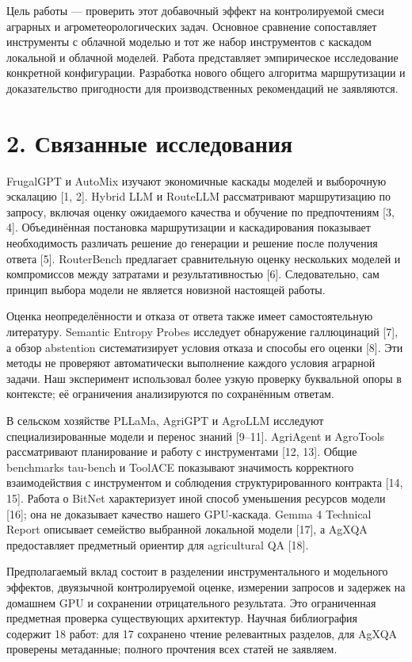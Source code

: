 \documentclass[14pt,a4paper]{extarticle}
\begin{document}
Цель работы --- проверить этот добавочный эффект на контролируемой смеси аграрных и агрометеорологических задач. Основное сравнение сопоставляет инструменты с облачной моделью и тот же набор инструментов с каскадом локальной и облачной моделей. Работа представляет эмпирическое исследование конкретной конфигурации. Разработка нового общего алгоритма маршрутизации и доказательство пригодности для производственных рекомендаций не заявляются.


\section*{2. Связанные исследования}

FrugalGPT и AutoMix изучают экономичные каскады моделей и выборочную эскалацию [1, 2]. Hybrid LLM и RouteLLM рассматривают маршрутизацию по запросу, включая оценку ожидаемого качества и обучение по предпочтениям [3, 4]. Объединённая постановка маршрутизации и каскадирования показывает необходимость различать решение до генерации и решение после получения ответа [5]. RouterBench предлагает сравнительную оценку нескольких моделей и компромиссов между затратами и результативностью [6]. Следовательно, сам принцип выбора модели не является новизной настоящей работы.


Оценка неопределённости и отказа от ответа также имеет самостоятельную литературу. Semantic Entropy Probes исследует обнаружение галлюцинаций [7], а обзор abstention систематизирует условия отказа и способы его оценки [8]. Эти методы не проверяют автоматически выполнение каждого условия аграрной задачи. Наш эксперимент использовал более узкую проверку буквальной опоры в контексте; её ограничения анализируются по сохранённым ответам.


В сельском хозяйстве PLLaMa, AgriGPT и AgroLLM исследуют специализированные модели и перенос знаний [9--11]. AgriAgent и AgroTools рассматривают планирование и работу с инструментами [12, 13]. Общие benchmarks tau-bench и ToolACE показывают значимость корректного взаимодействия с инструментом и соблюдения структурированного контракта [14, 15]. Работа о BitNet характеризует иной способ уменьшения ресурсов модели [16]; она не доказывает качество нашего GPU-каскада. Gemma 4 Technical Report описывает семейство выбранной локальной модели [17], а AgXQA предоставляет предметный ориентир для agricultural QA [18].


Предполагаемый вклад состоит в разделении инструментального и модельного эффектов, двуязычной контролируемой оценке, измерении запросов и задержек на домашнем GPU и сохранении отрицательного результата. Это ограниченная предметная проверка существующих архитектур. Научная библиография содержит 18 работ: для 17 сохранено чтение релевантных разделов, для AgXQA проверены метаданные; полного прочтения всех статей не заявляем.
\end{document}
